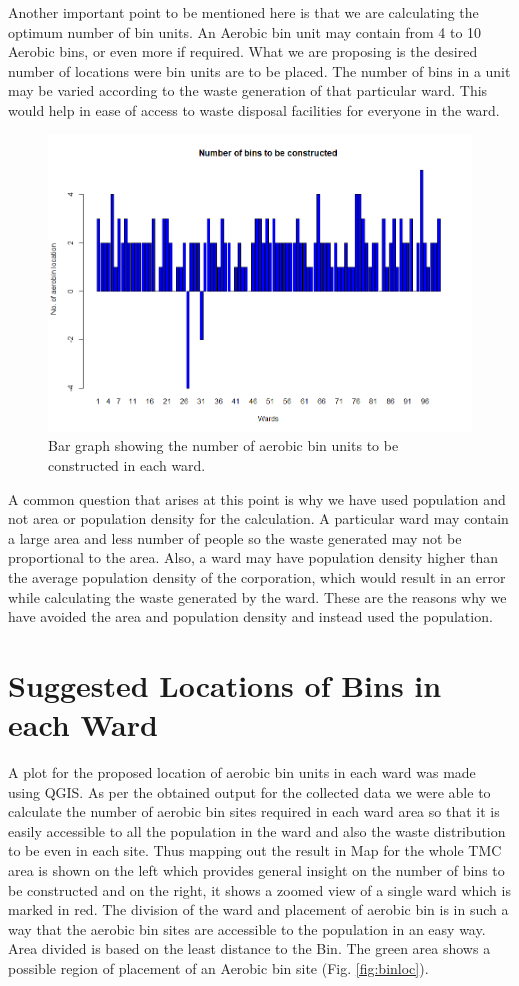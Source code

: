 \documentclass[12pt,a4paper]{report}
\begin{document}
Another important point to be mentioned here is that we are calculating the optimum number of bin units. An Aerobic bin unit may contain from 4 to 10 Aerobic bins, or even more if required. What we are proposing is the desired number of locations were bin units are to be placed. The number of bins in a unit may be varied according to the waste generation of that particular ward. This would help in ease of access to waste disposal facilities for everyone in the ward.

\begin{figure}[H]
	\centering
	\includegraphics[width=0.7\linewidth]{construc}
	\caption{Bar graph showing the number of aerobic bin units to be constructed in each ward.}
	\label{fig:construc}
\end{figure}

A common question that arises at this point is why we have used population and not area or population density for the calculation. A particular ward may contain a large area and less number of people so the waste generated may not be proportional to the area. Also, a ward may have population density higher than the average population density of the corporation, which would result in an error while calculating the waste generated by the ward. These are the reasons why we have avoided the area and population density and instead used the population.

\section{Suggested Locations of Bins in each Ward}
A plot for the proposed location of aerobic bin units in each ward was made using QGIS. As per the obtained output for the collected data we were able to calculate the number of aerobic bin sites required in each ward area so that it is easily accessible to all the population in the ward and also the waste distribution to be even in each site. Thus mapping out the result in Map for the whole TMC area is shown on the left which provides general insight on the number of bins to be constructed and on the right, it shows a zoomed view of a single ward which is marked in red. The division of the ward and placement of aerobic bin is in such a way that the aerobic bin sites are accessible to the population in an easy way. Area divided is based on the least distance to the Bin. The green area shows a possible region of placement of an Aerobic bin site (Fig. \ref{fig:binloc}).
\end{document}
